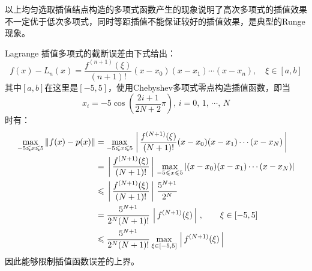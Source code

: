 \documentclass[11pt]{article}
\begin{document}
以上均匀选取插值结点构造的多项式函数产生的现象说明了高次多项式的插值效果不一定优于低次多项式，同时等距插值不能保证较好的插值效果，是典型的Runge现象。

Lagrange 插值多项式的截断误差由下式给出：
\begin{equation*}
    f(x) - L_n(x) = \frac{f^{(n + 1)}(\xi)}{(n + 1)!}(x - x_0)(x - x_1)\cdots(x - x_n), \quad \xi \in [a, b]
\end{equation*}
其中$[a, b]$在这里是$[-5, 5]$，使用Chebyshev多项式零点构造插值函数，即当$$x_i = -5\cos{\left(\dfrac{2i + 1}{2N + 2}\pi\right)},\, i = 0,\,1,\,\cdots,\,N$$时有：
\begin{align*}
    \max_{-5 \leqslant x \leqslant 5}{\left \Arrowvert f(x) - p(x)\right \Arrowvert} & = \max_{-5 \leqslant x \leqslant 5}{\left \arrowvert\frac{f^{(N + 1)}(\xi)}{(N + 1)!}(x - x_0)(x - x_1)\cdots(x - x_N)\right \arrowvert}                       \\
                                                                                     & = \left \arrowvert \frac{f^{(N + 1)}(\xi)}{(N + 1)!}\right \arrowvert \max_{-5 \leqslant x \leqslant 5}{\arrowvert(x - x_0)(x - x_1)\cdots(x - x_N)\arrowvert} \\
                                                                                     & \leqslant \left \arrowvert \frac{f^{(N + 1)}(\xi)}{(N + 1)!} \right \arrowvert \frac{5^{N + 1}}{2^N}                                                           \\
                                                                                     & = \frac{5^{N + 1}}{2^N(N + 1)!} \left \arrowvert f^{(N + 1)}(\xi) \right \arrowvert, \qquad \xi \in [-5, 5]                                                    \\
                                                                                     & \leqslant \frac{5^{N + 1}}{2^N(N + 1)!} \max_{\xi \in [-5, 5]}{\left \arrowvert f^{(N + 1)}(\xi) \right \arrowvert}
\end{align*}
因此能够限制插值函数误差的上界。
\end{document}
